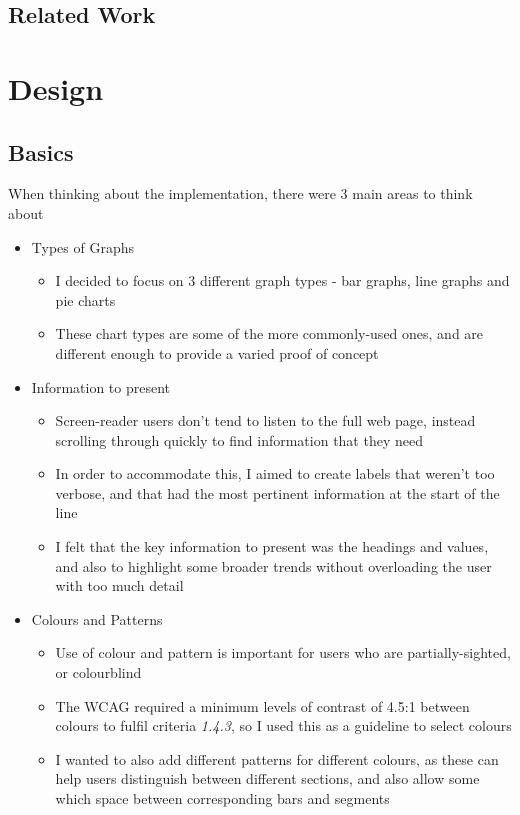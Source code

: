 \documentclass[ %
                    author={Aleena Baig},
                supervisor={Dr Simon Lock},
                    degree={BSc},
                     title={On Making Web Accessible Graphs},
                  subtitle={},
                      year={2019} ]{dissertation}
\begin{document}
\section{Related Work}



\chapter{Design}

\section{Basics}

When thinking about the implementation, there were 3 main areas to think about

\begin{itemize}
    \item Types of Graphs
    \begin{itemize}
        \item I decided to focus on 3 different graph types - bar graphs, line graphs and pie charts
        \item These chart types are some of the more commonly-used ones, and are different enough to provide a varied proof of concept
    \end{itemize}
    \item Information to present
    \begin{itemize}
        \item Screen-reader users don't tend to listen to the full web page, instead scrolling through quickly to find information that they need
        \item In order to accommodate this, I aimed to create labels that weren't too verbose, and that had the most pertinent information at the start of the line
        \item I felt that the key information to present was the headings and values, and also to highlight some broader trends without overloading the user with too much detail
    \end{itemize}
    \item Colours and Patterns
    \begin{itemize}
        \item Use of colour and pattern is important for users who are partially-sighted, or colourblind
        \item The WCAG required a minimum levels of contrast of 4.5:1 between colours to fulfil criteria \textit{1.4.3}, so I used this as a guideline to select colours
        \item I wanted to also add different patterns for different colours, as these can help users distinguish between different sections, and also allow some which space between corresponding bars and segments
    \end{itemize}
\end{itemize}
\end{document}
